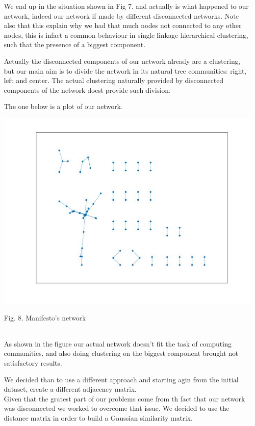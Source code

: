 \documentclass{article}%
\begin{document}
We end up in the situation shown in Fig 7. and actually is what happened to our network, indeed our network if made by different disconnected networks. Note also that this explain why we had that much nodes not connected to any other nodes, this is infact a common behaviour in single linkage hierarchical clustering, such that the presence of a biggest component.

Actually the disconnected components of our network already are a clustering, but our main aim is to divide the network in its natural tree communities: right, left and center.
The actual clustering naturally provided by disconnected components of the network doest provide such division.


The one below is a plot of our network.


\includegraphics[scale=0.5]{disc_graph}
\begin{center}
\begin{small}
Fig. 8. Manifesto's network
\end{small}
\end{center}
~
\\

As shown in the figure our actual network doesn't fit the task of computing communities, and also doing clustering on the biggest component brought not satisfactory results.

We decided than to use a different approach and starting agin from the initial dataset, create a different adjacency matrix.
\\

Given that the gratest part of our problems come from th fact that our network was disconnected we worked to overcome that issue. We decided to use the distance matrix in order to build a Gaussian similarity matrix.
\\
\end{document}
